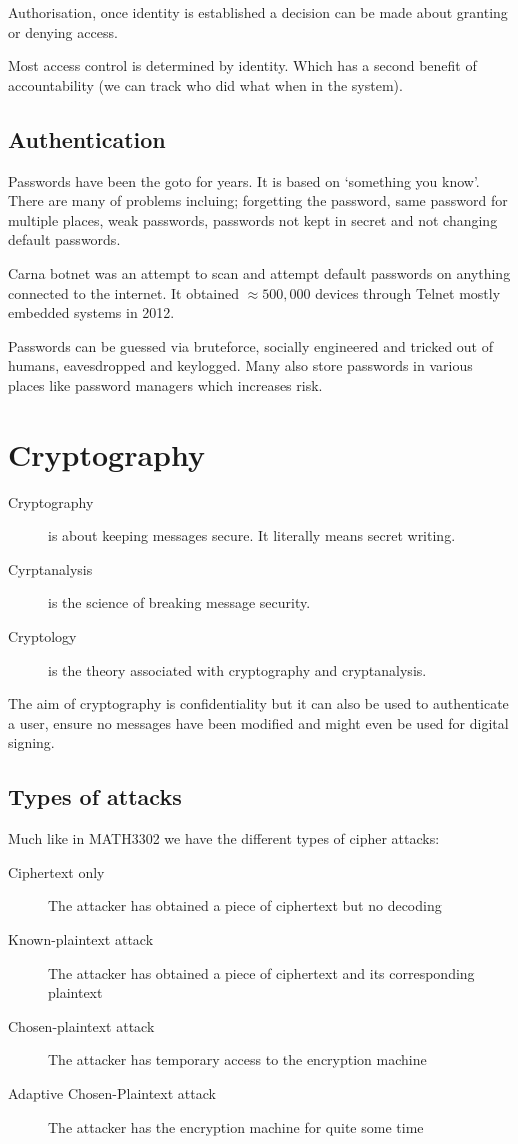 \documentclass{report}
\begin{document}
Authorisation, once identity is established a decision can be made about
granting or denying access.

Most access control is determined by identity. Which has a second benefit of
accountability (we can track who did what when in the system).

\section{Authentication}
Passwords have been the goto for years. It is based on `something you know'.
There are many of problems incluing; forgetting the password, same password for
multiple places, weak passwords, passwords not kept in secret and not changing
default passwords.

Carna botnet was an attempt to scan and attempt default passwords on anything
connected to the internet. It obtained $\approx 500,000$
devices through Telnet mostly embedded systems in 2012.

Passwords can be guessed via bruteforce, socially engineered and tricked out of
humans, eavesdropped and keylogged. Many also store passwords in various places
like password managers which increases risk.

\chapter{Cryptography}
\begin{description}
    \item [Cryptography] is about keeping messages secure. It literally means
secret writing.

    \item [Cyrptanalysis] is the science of breaking message security.

    \item [Cryptology] is the theory associated with
        cryptography and cryptanalysis.
\end{description}

The aim of cryptography is confidentiality but it can also be used to
authenticate a user, ensure no messages have been modified and
might even be used for digital signing.

\section{Types of attacks}
Much like in MATH3302 we have the different types of cipher attacks:
\begin{description}
    \item [Ciphertext only]
        The attacker has obtained a piece of ciphertext but no decoding
    \item [Known-plaintext attack]
        The attacker has obtained a piece of ciphertext and its corresponding
        plaintext
    \item [Chosen-plaintext attack]
        The attacker has temporary access to the encryption machine
    \item [Adaptive Chosen-Plaintext attack]
        The attacker has the encryption machine for quite some time
\end{description}
\end{document}
